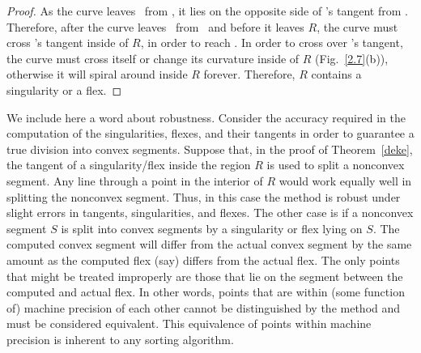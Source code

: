\begin{proof}
%

As the curve leaves \xotha\ from \xo,
it lies on the opposite side of \xo's tangent from \seg{\xo\xth}.
Therefore, after the curve leaves \xotha\ from \xo\ and before it leaves
$R$, the curve must cross \xo's tangent inside of $R$, in order to reach 
\seg{\xo\xth}.
In order to cross over \xo's tangent, the curve
must cross itself or change its curvature inside of $R$ (Fig.~\ref{2.7}(b)),
otherwise it will spiral around inside $R$ forever.
Therefore, $R$ contains a singularity or a flex.
\end{proof}

We include here a word about robustness.
Consider the accuracy required in the computation of the singularities, 
flexes, 
and their tangents in order to guarantee a true division into convex 
segments.
Suppose that, in the proof of Theorem~\ref{deke}, the tangent of a 
singularity/flex inside the region $R$ is used to split a nonconvex segment.
Any line through a point in the interior of $R$ would work equally well in 
splitting
the nonconvex segment.
Thus, in this case the method is robust under slight errors in tangents, 
singularities,
and flexes.
The other case is if a nonconvex segment $S$ is split into convex segments 
by a 
singularity or flex lying on $S$. 
The computed convex segment will differ from the actual convex segment by 
the same
amount as the computed flex (say) differs from the actual flex.
The only points that might be treated improperly are those that lie on the 
segment
between the computed and actual flex.
In other words, points that are within (some function of) machine precision 
of each other cannot be distinguished by the method and must be considered 
equivalent.
This equivalence of points within machine precision is inherent to any 
sorting 
algorithm.

